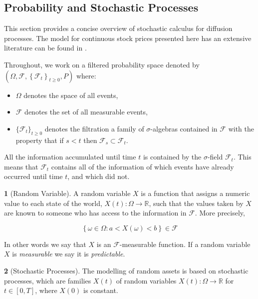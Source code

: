 \documentclass[british]{amsart} \usepackage{lmodern}
\numberwithin{equation}{section} \numberwithin{figure}{section}
\theoremstyle{plain} \newtheorem{thm}{\protect\theoremname}[section]
\theoremstyle{definition} \newtheorem{defn}[thm]{\protect\definitionname}
\theoremstyle{plain} \newtheorem{assumption}[thm]{\protect\assumptionname}
\theoremstyle{plain} \newtheorem{lem}[thm]{\protect\lemmaname}
\theoremstyle{plain} \newtheorem{prop}[thm]{\protect\propositionname}
\theoremstyle{remark} \newtheorem{rem}[thm]{\protect\remarkname}
\theoremstyle{plain} \newtheorem{cor}[thm]{\protect\corollaryname}
\begin{document}
\subsection{Probability and Stochastic Processes}

This section provides a concise overview of stochastic calculus for
diffusion processes. The model for continuous stock prices presented
here has an extensive literature can be found in \cite{shreve1991}.

Throughout, we work on a filtered probability space denoted
by $(\Omega,\mathcal{F},\left\{ \mathcal{F}_{t}\right\} _{t\ge0},P)$
where:

\begin{itemize}
  \item $\Omega$ denotes the space of all events,
  \item $\mathcal{F}$ denotes the set of all measurable events,
  \item $\{ \mathcal{F}_{t}\}_{t\ge0}$ denotes the filtration
         a family of $\sigma$-algebras contained in $\mathcal{F}$ with
        the property that if $s<t$ then $\mathcal{F}_{s}\subset\mathcal{F}_{t}$. 
\end{itemize}

All the information accumulated until time $t$ is contained by the
$\sigma$-field $\mathcal{F}_{t}$. This means that $\mathcal{F}_{t}$ contains 
all of the information of which events have already occurred until time $t$, 
and which did not. 

\begin{defn} [Random Variable]
 A random variable $X$ is a function that assigns a numeric value to each state of 
 the world, $X(t):\Omega\to\mathbb{R}$, such that the values taken by
 $X$ are known to someone who has access to the information in $\mathcal{F}$. 
  More precisely,

  \begin{equation}
    \left\{
      \omega \in \Omega : a < X(\omega) < b
    \right\} \in \mathcal{F}
  \end{equation}

  In other words we say that $X$ is an $\mathcal{F}$-measurable function. 
  If a random variable $X$ is \textit{measurable} we say it is \textit{predictable}.

\end{defn}

\begin{defn} [Stochastic Processes]
  The modelling of random assets is based on stochastic processes, which are
  families $X(t)$  of random variables $X(t):\Omega\to\mathbb{R}$ for $t\in[0,T]$,
  where $X(0)$ is constant.
\end{defn}
\end{document}
